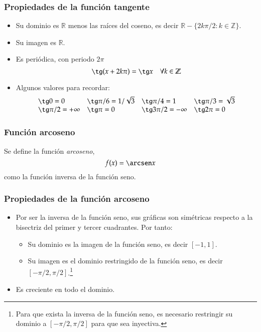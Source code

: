 \begin{frame}
\frametitle{Propiedades de la función tangente}
\begin{itemize}
\item Su dominio es $\mathbb{R}$ menos las raíces del coseno, es decir $\mathbb{R}-\{2k\pi/2: k\in \mathbb{Z}\}$.
\item Su imagen es $\mathbb{R}$.
\item Es periódica, con periodo $2\pi$
\[\tg (x+2k\pi)= \tg x\quad \forall k\in \mathbb{Z}\]
\item Algunos valores para recordar:
\[
\begin{array}{llll}
\tg 0=0 & \tg \pi/6= 1/\sqrt{3} & \tg \pi/4=1 & \tg \pi/3= \sqrt{3}\\
\tg \pi/2 =+\infty & \tg \pi =0 & \tg 3\pi/2=-\infty & \tg 2\pi=0
\end{array}
\]
\end{itemize}
\end{frame} 


\begin{frame}
\frametitle{Función arcoseno}
\begin{definicion}
Se define la función \emph{arcoseno},
\[f(x)=\arcsen x\]
como la función inversa de la función seno.
\end{definicion}
\begin{center}
\scalebox{1}{}
\end{center}
\end{frame} 



\begin{frame}
\frametitle{Propiedades de la función arcoseno}
\begin{itemize}
\item Por ser la inversa de la función seno, sus gráficas son simétricas respecto a la bisectriz del primer y tercer cuadrantes. Por tanto:
\begin{itemize}
\item Su dominio es la imagen de la función seno, es decir $[-1,1]$.
\item Su imagen es el dominio restringido de la función seno, es decir $[-\pi/2,\pi/2]$.\footnote{Para que exista la inversa de la función seno, es necesario restringir su dominio a $[-\pi/2,\pi/2]$ para que sea inyectiva.}
\end{itemize}
\item Es creciente en todo el dominio.
\end{itemize}
\end{frame} 


